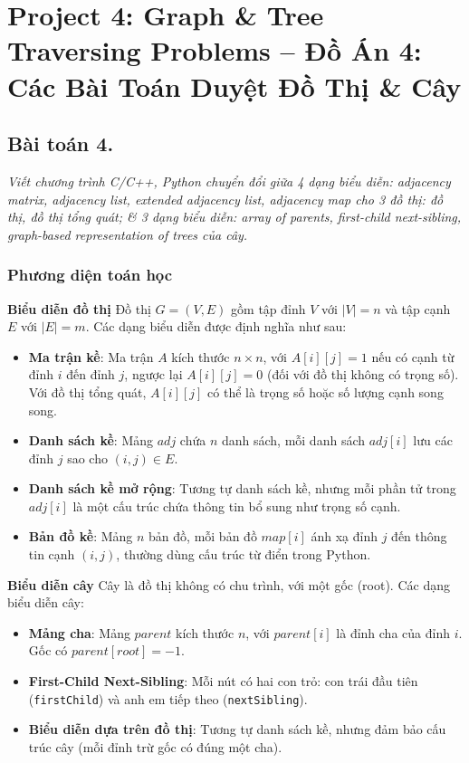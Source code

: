 \documentclass[a4paper,12pt]{article}
\begin{document}
  
\newpage

\section{Project 4: Graph \& Tree Traversing Problems – Đồ Án 4: Các Bài Toán Duyệt Đồ Thị \& Cây}

\subsection{Bài toán 4.} \textit{Viết chương trình C/C++, Python chuyển đổi giữa 4 dạng biểu diễn: adjacency matrix, adjacency list, extended adjacency list, adjacency map cho 3 đồ thị: đồ thị, đồ thị tổng quát; \& 3 dạng biểu diễn: array of parents, first-child next-sibling, graph-based representation of trees của cây.}

\subsubsection{Phương diện toán học}

\textbf{Biểu diễn đồ thị}
Đồ thị \( G = (V, E) \) gồm tập đỉnh \( V \) với \( |V| = n \) và tập cạnh \( E \) với \( |E| = m \). Các dạng biểu diễn được định nghĩa như sau:

\begin{itemize}
    \item \textbf{Ma trận kề}: Ma trận \( A \) kích thước \( n \times n \), với \( A[i][j] = 1 \) nếu có cạnh từ đỉnh \( i \) đến đỉnh \( j \), ngược lại \( A[i][j] = 0 \) (đối với đồ thị không có trọng số). Với đồ thị tổng quát, \( A[i][j] \) có thể là trọng số hoặc số lượng cạnh song song.
    \item \textbf{Danh sách kề}: Mảng \( adj \) chứa \( n \) danh sách, mỗi danh sách \( adj[i] \) lưu các đỉnh \( j \) sao cho \( (i, j) \in E \).
    \item \textbf{Danh sách kề mở rộng}: Tương tự danh sách kề, nhưng mỗi phần tử trong \( adj[i] \) là một cấu trúc chứa thông tin bổ sung như trọng số cạnh.
    \item \textbf{Bản đồ kề}: Mảng \( n \) bản đồ, mỗi bản đồ \( map[i] \) ánh xạ đỉnh \( j \) đến thông tin cạnh \( (i, j) \), thường dùng cấu trúc từ điển trong Python.
\end{itemize}

\textbf{Biểu diễn cây}
Cây là đồ thị không có chu trình, với một gốc (root). Các dạng biểu diễn cây:

\begin{itemize}
    \item \textbf{Mảng cha}: Mảng \( parent \) kích thước \( n \), với \( parent[i] \) là đỉnh cha của đỉnh \( i \). Gốc có \( parent[root] = -1 \).
    \item \textbf{First-Child Next-Sibling}: Mỗi nút có hai con trỏ: con trái đầu tiên (\texttt{firstChild}) và anh em tiếp theo (\texttt{nextSibling}).
    \item \textbf{Biểu diễn dựa trên đồ thị}: Tương tự danh sách kề, nhưng đảm bảo cấu trúc cây (mỗi đỉnh trừ gốc có đúng một cha).
\end{itemize}
\end{document}
